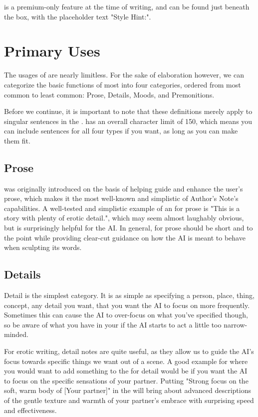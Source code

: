 ﻿\documentclass[Coomer-main.tex]{subfiles}
\begin{document}
\an is a premium-only feature at the time of writing, and can be found just beneath the \rem box, with the placeholder text "Style Hint:".

\section{Primary Uses}

The usages of \an are nearly limitless.
For the sake of elaboration however, we can categorize the basic functions of most \ans into four categories, ordered from most common to least common: Prose, Details, Moods, and Premonitions.

Before we continue, it is important to note that these definitions merely apply to singular sentences in the \an. \an has an overall character limit of 150, which means you can include sentences for all four types if you want, as long as you can make them fit.

\subsection{Prose}

\an was originally introduced on the basis of helping guide and enhance the user's prose, which makes it the most well-known and simplistic of Author's Note's capabilities.
A well-tested and simplistic example of an \an for prose is "This is a story with plenty of erotic detail.", which may seem almost laughably obvious, but is surprisingly helpful for the AI.
In general, \ans for prose should be short and to the point while providing clear-cut guidance on how the AI is meant to behave when sculpting its words.

\subsection{Details}

Detail is the simplest \an category.
It is as simple as specifying a person, place, thing, concept, any detail you want, that you want the AI to focus on more frequently.
Sometimes this can cause the AI to over-focus on what you've specified though, so be aware of what you have in your \an if the AI starts to act a little too narrow-minded.

For erotic writing, detail notes are quite useful, as they allow us to guide the AI's focus towards specific things we want out of a scene.
A good example for where you would want to add something to the \an for detail would be if you want the AI to focus on the specific sensations of your partner.
Putting "Strong focus on the soft, warm body of [Your partner]" in the \an will bring about advanced descriptions of the gentle texture and warmth of your partner’s embrace with surprising speed and effectiveness.
\end{document}
